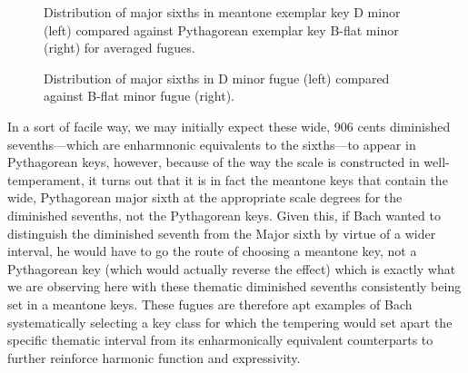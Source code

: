 \begin{figure}[H]
\vspace{1.5em}
    \centering
    \caption[Distribution of major sixths in meantone exemplar key D minor compared against Pythagorean exemplar key B-flat minor for averaged fugues. ]{Distribution of major sixths in meantone exemplar key D minor (left) compared against Pythagorean exemplar key B-flat minor (right) for averaged fugues.}
\end{figure}

\begin{figure}[H]
\vspace{1.5em}
    \centering
    \caption[Distribution of major sixths in D minor fugue compared against B-flat minor fugue. ]{Distribution of major sixths in D minor fugue (left) compared against B-flat minor fugue (right).}
\end{figure}    In a sort of facile way, we may initially expect these wide, 906 cents
diminished sevenths---which are enharmnonic equivalents to the
sixths---to appear in Pythagorean keys, however, because of the way
the scale is constructed in well-temperament, it turns out that it is in
fact the meantone keys that contain the wide, Pythagorean major sixth at
the appropriate scale degrees for the diminished sevenths, not the
Pythagorean keys. Given this, if Bach wanted to distinguish the
diminished seventh from the Major sixth by virtue of a wider interval,
he would have to go the route of choosing a meantone key, not a
Pythagorean key (which would actually reverse the effect) which is
exactly what we are observing here with these thematic diminished
sevenths consistently being set in a meantone keys. These fugues are
therefore apt examples of Bach systematically selecting a key class for
which the tempering would set apart the specific thematic interval from
its enharmonically equivalent counterparts to further reinforce harmonic
function and expressivity.

